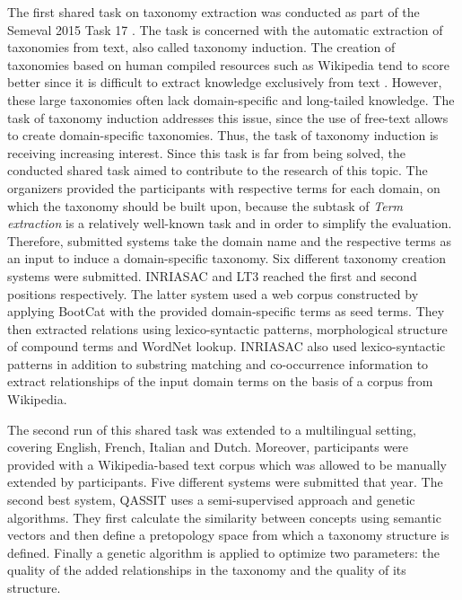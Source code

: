\documentclass[12pt, headsepline, a4paper]{scrartcl}
\begin{document}
The first shared task on taxonomy extraction was conducted as part of the Semeval 2015 Task 17 \citep{task17semeval2015}. The task is concerned with the automatic extraction of taxonomies from text, also called taxonomy induction. The creation of taxonomies based on human compiled resources such as Wikipedia \citep{mahdisoltani2013yago3, suchanek2007yago} tend to score better since it is difficult to extract knowledge exclusively from text \citep{wang2017short}. However, these large taxonomies often lack domain-specific and long-tailed knowledge. The task of taxonomy induction addresses this issue, since the use of free-text allows to create domain-specific taxonomies. Thus, the task of taxonomy induction is receiving increasing interest. Since this task is far from being solved, the conducted shared task aimed to contribute to the research of this topic. The organizers provided the participants with respective terms for each domain, on which the taxonomy should be built upon, because the subtask of \emph{Term extraction} is a relatively well-known task and in order to simplify the evaluation. Therefore, submitted systems take the domain name and the respective terms as an input to induce a domain-specific taxonomy. Six different taxonomy creation systems were submitted. INRIASAC and LT3 reached the first and second positions respectively. The latter system used a web corpus constructed by applying BootCat with the provided domain-specific terms as seed terms. They then extracted relations using lexico-syntactic patterns, morphological structure of compound terms and WordNet lookup. INRIASAC also used lexico-syntactic patterns in addition to substring matching and co-occurrence information to extract relationships of the input domain terms on the basis of a corpus from Wikipedia. 

The second run of this shared task \citep{bordea2016semeval} was extended to a multilingual setting, covering English, French, Italian and Dutch. Moreover, participants were provided with a Wikipedia-based text corpus which was allowed to be manually extended by participants. Five different systems were submitted that year. The second best system, QASSIT \citep{S16-1205} uses a semi-supervised approach and genetic algorithms. They first calculate the similarity between concepts using semantic vectors and then define a pretopology space from which a taxonomy structure is defined. Finally a genetic algorithm is applied to optimize two parameters: the quality of the added relationships in the taxonomy and the quality of its structure.
\end{document}
